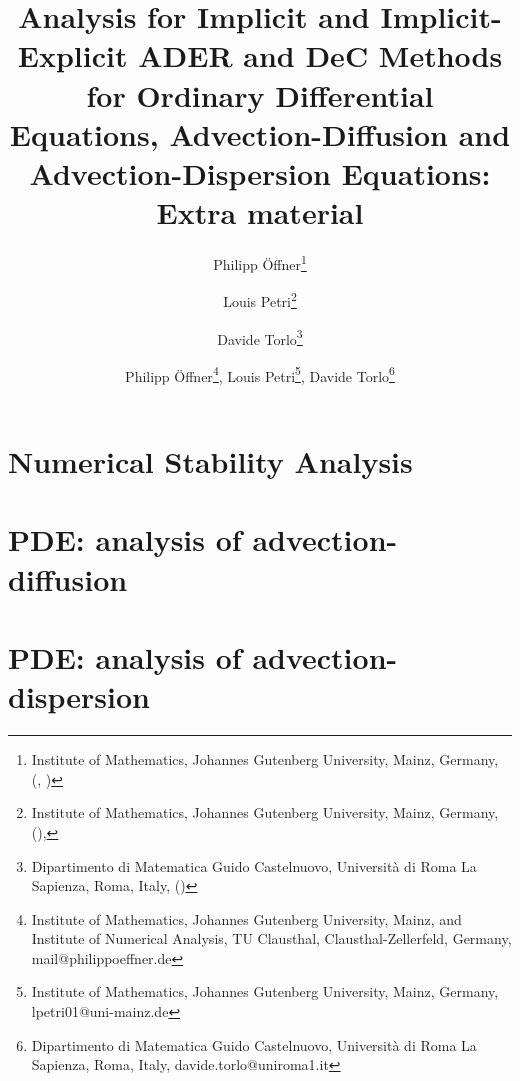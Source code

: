 \documentclass[USenglish]{article}
\author{
	Philipp \"Offner\thanks{Institute of Mathematics, Johannes Gutenberg University, Mainz, Germany, (\email{poeffner@uni-mainz.de}, \orcid{0000-0002-1367-1917})
	} 
	\and 
	Louis Petri\thanks{Institute of Mathematics, Johannes Gutenberg University, Mainz, Germany, (\email{lpetri01@uni-mainz.de}), } 
	\and 
	Davide Torlo\thanks{Dipartimento di Matematica Guido Castelnuovo, Università di Roma La Sapienza,  Roma, Italy, (\email{davide.torlo@uniroma1.it})} 
}
\newcommand{\1}{\begin{pmatrix}
		1\\
		1
\end{pmatrix}}
\begin{document}
	\title{Analysis for Implicit and Implicit-Explicit ADER and DeC Methods for Ordinary Differential Equations, Advection-Diffusion and Advection-Dispersion Equations:\\ Extra material}
	
	\author{Philipp \"Offner\thanks{Institute of Mathematics, Johannes Gutenberg University, Mainz, and Institute of Numerical Analysis,  TU Clausthal, Clausthal-Zellerfeld, Germany, mail@philippoeffner.de},
	Louis Petri\thanks{Institute of Mathematics, Johannes Gutenberg University, Mainz, Germany, lpetri01@uni-mainz.de },  
	Davide Torlo\thanks{Dipartimento di Matematica Guido Castelnuovo, Università di Roma La Sapienza,  Roma, Italy, davide.torlo@uniroma1.it}
	}
	\date{}
	\maketitle
	
%			
	
	
	
	\section{Numerical Stability Analysis}
	\label{sec: stability_analysis_ODE}
	

	\section{PDE: analysis of advection-diffusion}
	\label{sec: advection_diffusion}
	 
	
	\section{PDE: analysis of advection-dispersion}
	\label{sec:PDE_adv_disp}
	 
	
%
%	 
	

	
\end{document}
